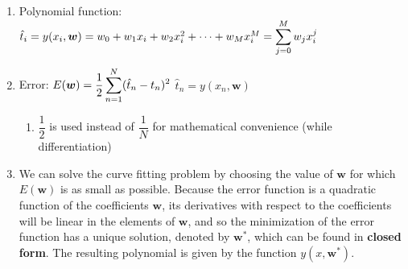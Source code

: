 \begin{enumerate}
    \item Polynomial function:
    $
        \hat{t}_i 
        = y(x_i, \bm{w}) 
        = w_0 + w_1x_i + w_2x_i^2 + \cdots + w_M x_i^M 
        = \displaystyle\sum ^M _{j=0} w_j x_i^j
    $
    \hfill \cite{ml/book/Pattern-Recognition-And-Machine-Learning/Christopher-M-Bishop}

    \item Error: 
    $
        E(\bm{w}) 
        = \dfrac{1}{2} \displaystyle\sum_{n=1}^N (\hat{t}_n - t_n)^2
    $
    \hfill
    $
        \hat{t}_n = y(x_n, \bm{w})
    $
    \hfill \cite{ml/book/Pattern-Recognition-And-Machine-Learning/Christopher-M-Bishop}
    \begin{enumerate}
        \item $\dfrac{1}{2}$ is used instead of $\dfrac{1}{N}$ for mathematical convenience (while differentiation)
    \end{enumerate}

    \item We can solve the curve fitting problem by choosing the value of $\bm{w}$ for which $E(\bm{w})$ is as small as possible. 
    Because the error function is a quadratic function of the coefficients $\bm{w}$, its derivatives with respect to the coefficients will be linear in the elements of $\bm{w}$, and so the minimization of the error function has a unique solution, denoted by $\bm{w}^\ast$, which can be found in \textbf{closed form}. 
    The resulting polynomial is given by the function $y(x, \bm{w}^\ast)$.
    \hfill \cite{ml/book/Pattern-Recognition-And-Machine-Learning/Christopher-M-Bishop}
\end{enumerate}















